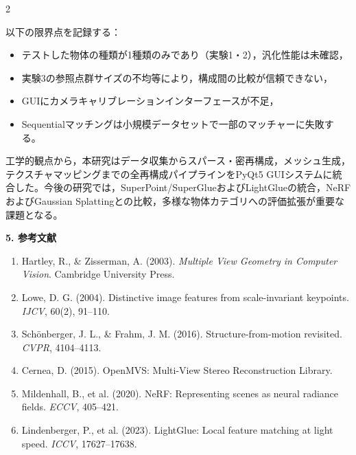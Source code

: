 \begin{multicols}{2}

以下の限界点を記録する：
\begin{itemize}
    \item テストした物体の種類が1種類のみであり（実験1・2），汎化性能は未確認，
    \item 実験3の参照点群サイズの不均等により，構成間の比較が信頼できない，
    \item GUIにカメラキャリブレーションインターフェースが不足，
    \item Sequentialマッチングは小規模データセットで一部のマッチャーに失敗する。
\end{itemize}

工学的観点から，本研究はデータ収集からスパース・密再構成，メッシュ生成，テクスチャマッピングまでの全再構成パイプラインをPyQt5 GUIシステムに統合した。今後の研究では，SuperPoint/SuperGlueおよびLightGlueの統合，NeRFおよびGaussian Splattingとの比較，多様な物体カテゴリへの評価拡張が重要な課題となる。

\noindent\textbf{5. 参考文献}

\small
\begin{enumerate}
\setlength{\itemsep}{1pt}\setlength{\parsep}{0pt}\setlength{\topsep}{2pt}
    \item Hartley, R., \& Zisserman, A. (2003). \textit{Multiple View Geometry in Computer Vision}. Cambridge University Press.
    \item Lowe, D. G. (2004). Distinctive image features from scale-invariant keypoints. \textit{IJCV}, 60(2), 91--110.
    \item Sch{\"o}nberger, J. L., \& Frahm, J. M. (2016). Structure-from-motion revisited. \textit{CVPR}, 4104--4113.
    \item Cernea, D. (2015). OpenMVS: Multi-View Stereo Reconstruction Library.
    \item Mildenhall, B., et al. (2020). NeRF: Representing scenes as neural radiance fields. \textit{ECCV}, 405--421.
    \item Lindenberger, P., et al. (2023). LightGlue: Local feature matching at light speed. \textit{ICCV}, 17627--17638.
\end{enumerate}
\normalsize

\end{multicols}
